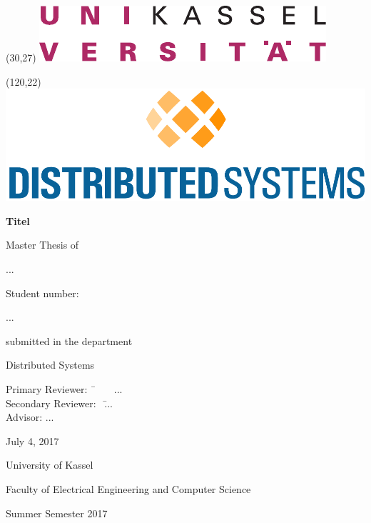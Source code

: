 \begin{titlepage}
\newcommand{\Titel}[2][\textwidth]{\renewcommand{\baselinestretch}{1.0}\hfil
            \parbox{#1}{\huge\bfseries\centering #2}\hfil\par}
\renewcommand{\subtitle}[2][\textwidth]{\renewcommand{\baselinestretch}{1.0}\hfil
            \parbox{#1}{\LARGE\centering\mbox{}\llap{--~}#2\rlap{~--}}\hfil\par}
\newcommand{\addLine}[2][\textwidth]{\renewcommand{\baselinestretch}{1.0}\hfil
            \parbox{#1}{\large\centering #2}\hfil\par}


\begin{textblock}{40}(30,27)
 \includegraphics[scale=0.7]{images/unilogo.pdf}
\end{textblock}

\begin{textblock}{40}(120,22)
 \includegraphics[scale=0.3]{images/vs-logo-en.pdf}
\end{textblock}

\addLine{}
\vspace{0.2\textheight}

\Titel{Titel}

\vspace{0.03\textheight}


\vspace{0.03\textheight}
\addLine{Master Thesis of}
\addLine{\LARGE ...}
\addLine{Student number:}
\addLine{\LARGE ...}
\addLine{submitted in the department}
\addLine{\LARGE Distributed Systems}
\vspace{0.1\textheight} 
\addLine{
  \begin{tabbing}
   Primary Reviewer: \quad ~\=  ~~~\:...\\
   Secondary Reviewer: \quad ~\= ...\\
   Advisor: \quad \> ...
  \end{tabbing}
}
\vspace{0.04\textheight} 
\addLine{July 4, 2017}
\vspace{0.04\textheight} 
\addLine{University of Kassel}
\addLine{Faculty of Electrical Engineering and Computer Science}
\addLine{Summer Semester 2017}
\end{titlepage}



